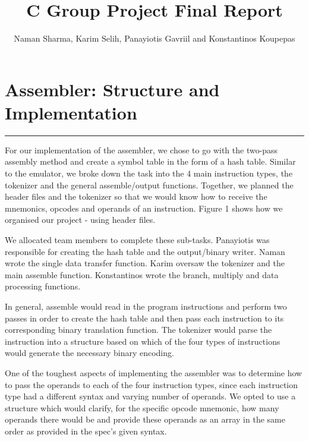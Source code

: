 \documentclass{article}
\title{C Group Project Final Report}
\author{Naman Sharma, Karim Selih, Panayiotis Gavriil and Konstantinos Koupepas}
\begin{document}
\maketitle
\thispagestyle{firstpage} 
\tableofcontents


\section{Assembler: Structure and Implementation}
\rule{\textwidth}{0.05em}
\vspace{0.1em}

For our implementation of the assembler, we chose to go with the two-pass assembly method and create a symbol table in the form of a hash table. Similar to the emulator, we broke down the task into the 4 main instruction types, the tokenizer and the general assemble/output functions. Together, we planned the header files and the tokenizer so that we would know how to receive the mnemonics, opcodes and operands of an instruction. Figure 1 shows how we organised our project - using header files. \\  \par \noindent
We allocated team members to complete these sub-tasks. Panayiotis was responsible for creating the hash table and the output/binary writer. Naman wrote the single data transfer function. Karim oversaw the tokenizer and the main assemble function.  Konstantinos wrote the branch, multiply and data processing functions. \\  \par \noindent
In general, assemble would read in the program instructions and perform two passes in order to create the hash table and then pass each instruction to its corresponding binary translation function. The tokenizer would parse the instruction into a structure based on which of the four types of instructions would generate the necessary binary encoding. \\  \par \noindent
One of the toughest aspects of implementing the assembler was to determine how to pass the operands to each of the four instruction types, since each instruction type had a different syntax and varying number of operands. We opted to use a structure which would clarify, for the specific opcode mnemonic, how many operands there would be and provide these operands as an array in the same order as provided in the spec's given syntax. \\ \par \noindent
\end{document}
